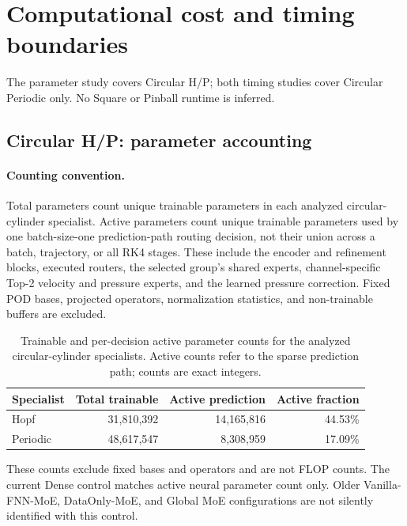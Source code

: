 \clearpage
\section{Computational cost and timing boundaries}
\label{app:parameter_counts}

The parameter study covers Circular H/P; both timing studies cover
Circular Periodic only. No Square or Pinball runtime is inferred.

\subsection{Circular H/P: parameter accounting}
\paragraph{Counting convention.}
Total parameters count unique trainable parameters in each analyzed
circular-cylinder specialist. Active parameters count unique trainable
parameters used by one batch-size-one prediction-path routing decision,
not their union across a batch, trajectory, or all RK4 stages. These include
the encoder and refinement blocks, executed routers, the selected group's
shared experts, channel-specific Top-2 velocity and pressure experts, and
the learned pressure correction. Fixed POD bases, projected operators,
normalization statistics, and non-trainable buffers are excluded.

\par
\begin{table}[H]
\centering
\caption{Trainable and per-decision active parameter counts for the analyzed
circular-cylinder specialists. Active counts refer to the sparse prediction
path; counts are exact integers.}
\label{tab:parameter_counts}
\begin{tabular}{lrrr}
\toprule
Specialist & Total trainable & Active prediction & Active fraction \\
\midrule
Hopf & 31,810,392 & 14,165,816 & 44.53\% \\
Periodic & 48,617,547 & 8,308,959 & 17.09\% \\
\bottomrule
\end{tabular}
\end{table}
\par

These counts exclude fixed bases and operators and are not FLOP counts.
The current Dense control matches active neural parameter count only.
Older Vanilla-FNN-MoE, DataOnly-MoE, and Global MoE configurations are
not silently identified with this control.

